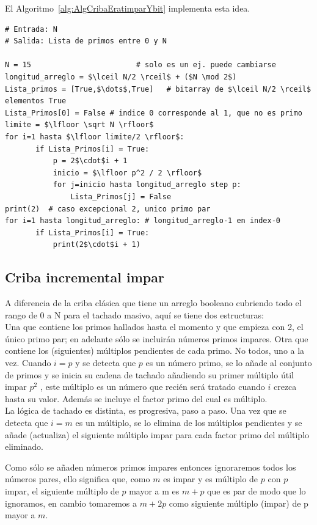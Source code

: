 El Algoritmo~\ref{alg:AlgCribaEratimparYbit} implementa esta idea.

\begin{lstlisting}[caption={Criba de Eratóstenes con sólo impares y bits}, label={alg:AlgCribaEratimparYbit}, mathescape=true]
# Entrada: N
# Salida: Lista de primos entre 0 y N 

N = 15                        # solo es un ej. puede cambiarse 
longitud_arreglo = $\lceil N/2 \rceil$ + ($N \mod 2$)
Lista_primos = [True,$\dots$,True]   # bitarray de $\lceil N/2 \rceil$ elementos True
Lista_Primos[0] = False # indice 0 corresponde al 1, que no es primo
limite = $\lfloor \sqrt N \rfloor$
for i=1 hasta $\lfloor limite/2 \rfloor$:
       if Lista_Primos[i] = True:
           p = 2$\cdot$i + 1
           inicio = $\lfloor p^2 / 2 \rfloor$
           for j=inicio hasta longitud_arreglo step p:
               Lista_Primos[j] = False
print(2)  # caso excepcional 2, unico primo par
for i=1 hasta longitud_arreglo: # longitud_arreglo-1 en index-0
       if Lista_Primos[i] = True:
           print(2$\cdot$i + 1)
\end{lstlisting}

\subsection{Criba incremental impar}
A diferencia de la criba clásica que tiene un arreglo booleano cubriendo todo el rango de 0 a N para el tachado masivo, aquí se tiene dos estructuras: \\
Una que contiene los primos hallados hasta el momento y que empieza con  2, el único primo par; en adelante sólo se incluirán números primos impares.
Otra que contiene los (siguientes) múltiplos pendientes de cada primo. No todos, uno a la vez.
Cuando $i=p$ y se detecta que $p$ es un número primo, se lo añade al conjunto de primos y se inicia su cadena de tachado añadiendo su primer múltiplo útil impar $p^2$ , este múltiplo es un número que recién será tratado cuando $i$ crezca hasta su valor. Además se incluye el factor primo del cual es múltiplo. \\
La lógica de tachado es distinta, es progresiva, paso a paso. Una vez que se detecta que $i=m$ es un múltiplo, se lo elimina de los múltiplos pendientes y se añade (actualiza) el siguiente múltiplo impar para cada factor primo del múltiplo eliminado.

Como sólo se añaden números primos impares entonces ignoraremos todos los números pares, ello significa que, como $m$ es impar y es múltiplo de $p$ con $p$ impar, el siguiente múltiplo de $p$ mayor a m es  $m+p$ que es par de modo que lo ignoramos, en cambio tomaremos a $m+2p$ como siguiente múltiplo (impar) de p mayor a $m$.

